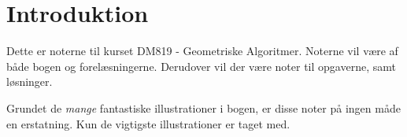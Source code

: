 \chapter{Introduktion}

Dette er noterne til kurset DM819 - Geometriske Algoritmer. Noterne vil være af både bogen og forelæsningerne. Derudover vil der være noter til opgaverne, samt løsninger.

Grundet de \textit{mange} fantastiske illustrationer i bogen, er disse noter på ingen måde en erstatning. Kun de vigtigste illustrationer er taget med.

